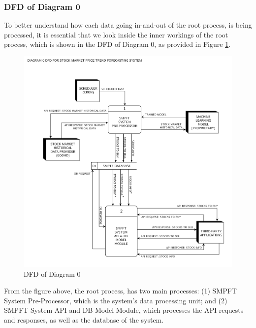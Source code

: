 \subsubsection{DFD of Diagram 0}
\label{subsubsec:dfd0}
To better understand how each data going in-and-out 
of the root process, is being processed, it is essential that we look inside 
the inner workings of the root process, which is shown in the DFD of Diagram 0, 
as provided in Figure \ref{fig:dfd0}.
\begin{figure}[ht]
    \centering
    \includegraphics[width=1\textwidth]{./assets//Data Flow Diagram-02.png}
    \caption{DFD of Diagram 0}
    \label{fig:dfd0}
\end{figure}
\FloatBarrier

From the figure above, the root process, has two main processes: 
(1) SMPFT System Pre-Processor, which is the system’s data processing unit; and 
(2) SMPFT System API and DB Model Module, which processes the API 
requests and responses, as well as the database of the system.


